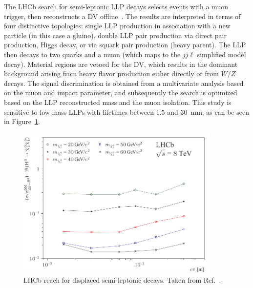 The LHCb search for semi-leptonic LLP decays selects events with a muon trigger, then reconstructs a DV offline~\cite{Aaij:2016xmb}. The results are interpreted in terms of four distinctive topologies: single LLP production in association with a new particle (in this case a gluino), double LLP pair production via direct pair production, Higgs decay, or via squark pair production (heavy parent). The LLP then decays to two quarks and a muon (which maps to the $jj\ell$ simplified model decay). Material regions are vetoed for the DV, which results in the dominant background arising from heavy flavor production either directly or from $W/Z$ decays. The signal discrimination is obtained from a multivariate analysis based on the muon \pT and impact parameter, and subsequently the search is optimized based on the LLP reconstructed mass and the muon isolation. This study is sensitive to low-mass LLPs with lifetimes between 1.5 and 30~mm, as can be seen in Figure~\ref{fig:lhcbsemi-leptonic}.
%
\begin{figure}[htb]
\centering
\includegraphics[width=0.9\textwidth]{plots/PAPER-2016-047_sup1.pdf}
\caption{LHCb reach for displaced semi-leptonic decays. Taken from Ref.~\cite{Aaij:2016xmb}.}
\label{fig:lhcbsemi-leptonic}
\end{figure}

